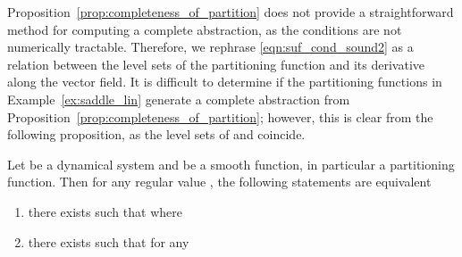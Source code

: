 Proposition~\ref{prop:completeness_of_partition} does not provide a straightforward method for computing a complete abstraction, as the conditions are not numerically tractable. Therefore, we rephrase \eqref{eqn:suf_cond_sound2} as a relation between the level sets of the partitioning function and its derivative along the vector field.
It is difficult to determine if the partitioning functions in Example~\ref{ex:saddle_lin} generate a complete abstraction from Proposition~\ref{prop:completeness_of_partition}; however, this is clear from the following proposition, as the level sets of  and  coincide.






\begin{proposition}\label{prop:prop2}
Let \dynSys be a dynamical system and  be a smooth function, in particular a partitioning function. Then for any regular value , the following statements are equivalent
\begin{enumerate}
\item there exists  such that 
where

\item there exists  such that for any 

\end{enumerate}
\end{proposition}
